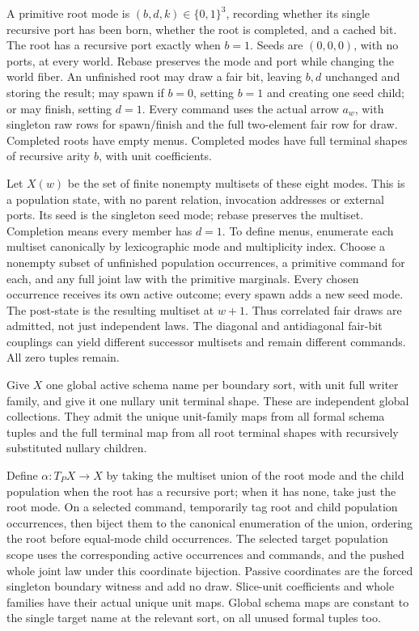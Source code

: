 \documentclass[11pt]{article}
\begin{document}
A primitive root mode is $(b,d,k)\in\{0,1\}^3$, recording whether its single recursive port has been born, whether the root is completed, and a cached bit. The root has a recursive port exactly when $b=1$. Seeds are $(0,0,0)$, with no ports, at every world. Rebase preserves the mode and port while changing the world fiber. An unfinished root may draw a fair bit, leaving $b,d$ unchanged and storing the result; may spawn if $b=0$, setting $b=1$ and creating one seed child; or may finish, setting $d=1$. Every command uses the actual arrow $a_w$, with singleton raw rows for spawn/finish and the full two-element fair row for draw. Completed roots have empty menus. Completed modes have full terminal shapes of recursive arity $b$, with unit coefficients.

Let $X(w)$ be the set of finite nonempty multisets of these eight modes. This is a population state, with no parent relation, invocation addresses or external ports. Its seed is the singleton seed mode; rebase preserves the multiset. Completion means every member has $d=1$. To define menus, enumerate each multiset canonically by lexicographic mode and multiplicity index. Choose a nonempty subset of unfinished population occurrences, a primitive command for each, and any full joint law with the primitive marginals. Every chosen occurrence receives its own active outcome; every spawn adds a new seed mode. The post-state is the resulting multiset at $w+1$. Thus correlated fair draws are admitted, not just independent laws. The diagonal and antidiagonal fair-bit couplings can yield different successor multisets and remain different commands. All zero tuples remain.

Give $X$ one global active schema name per boundary sort, with unit full writer family, and give it one nullary unit terminal shape. These are independent global collections. They admit the unique unit-family maps from all formal schema tuples and the full terminal map from all root terminal shapes with recursively substituted nullary children.

Define $\alpha:T_PX\to X$ by taking the multiset union of the root mode and the child population when the root has a recursive port; when it has none, take just the root mode. On a selected command, temporarily tag root and child population occurrences, then biject them to the canonical enumeration of the union, ordering the root before equal-mode child occurrences. The selected target population scope uses the corresponding active occurrences and commands, and the pushed whole joint law under this coordinate bijection. Passive coordinates are the forced singleton boundary witness and add no draw. Slice-unit coefficients and whole families have their actual unique unit maps. Global schema maps are constant to the single target name at the relevant sort, on all unused formal tuples too.
\end{document}
